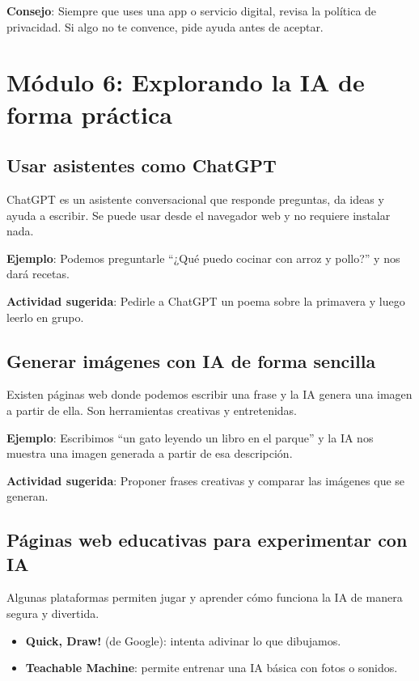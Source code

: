 \documentclass[12pt]{article}
\begin{document}
	\textbf{Consejo}: Siempre que uses una app o servicio digital, revisa la política de privacidad. Si algo no te convence, pide ayuda antes de aceptar.
	
	\newpage
	
	\section{\textbf{\normalsize Módulo 6: Explorando la IA de forma práctica}}
	
	\subsection*{Usar asistentes como ChatGPT}
	ChatGPT es un asistente conversacional que responde preguntas, da ideas y ayuda a escribir. Se puede usar desde el navegador web y no requiere instalar nada.
	
	\textbf{Ejemplo}: Podemos preguntarle “¿Qué puedo cocinar con arroz y pollo?” y nos dará recetas.
	
	\textbf{Actividad sugerida}: Pedirle a ChatGPT un poema sobre la primavera y luego leerlo en grupo.
	
	\subsection*{Generar imágenes con IA de forma sencilla}
	Existen páginas web donde podemos escribir una frase y la IA genera una imagen a partir de ella. Son herramientas creativas y entretenidas.
	
	\textbf{Ejemplo}: Escribimos “un gato leyendo un libro en el parque” y la IA nos muestra una imagen generada a partir de esa descripción.
	
	\textbf{Actividad sugerida}: Proponer frases creativas y comparar las imágenes que se generan.
	
	\subsection*{Páginas web educativas para experimentar con IA}
	Algunas plataformas permiten jugar y aprender cómo funciona la IA de manera segura y divertida.
	\begin{itemize}
		\item \textbf{Quick, Draw!} (de Google): intenta adivinar lo que dibujamos.
		\item \textbf{Teachable Machine}: permite entrenar una IA básica con fotos o sonidos.
	\end{itemize}
	
\end{document}
